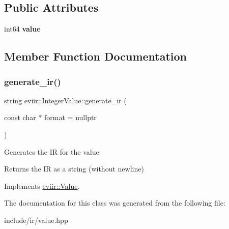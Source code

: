 \subsection*{Public Attributes}
\begin{DoxyCompactItemize}
\item 
\mbox{\label{classeviir_1_1IntegerValue_a6daae2d429977f76c8b1ab3b00a4ec33}} 
int64 {\bfseries value}
\end{DoxyCompactItemize}


\subsection{Member Function Documentation}
\mbox{\label{classeviir_1_1IntegerValue_a7f2653e23a8165a0eb43109d152cc0a2}} 
\subsubsection{\texorpdfstring{generate\+\_\+ir()}{generate\_ir()}}
{\footnotesize\ttfamily string eviir\+::\+Integer\+Value\+::generate\+\_\+ir (\begin{DoxyParamCaption}\item[{const char $\ast$}]{format = {\ttfamily nullptr} }\end{DoxyParamCaption})\hspace{0.3cm}{\ttfamily [virtual]}}

Generates the IR for the value \begin{DoxyReturn}{Returns}
the IR as a string (without newline) 
\end{DoxyReturn}


Implements \hyperlink{classeviir_1_1Value_a0613bf660425df31e230681555f64dea}{eviir\+::\+Value}.



The documentation for this class was generated from the following file\+:\begin{DoxyCompactItemize}
\item 
include/ir/value.\+hpp\end{DoxyCompactItemize}
